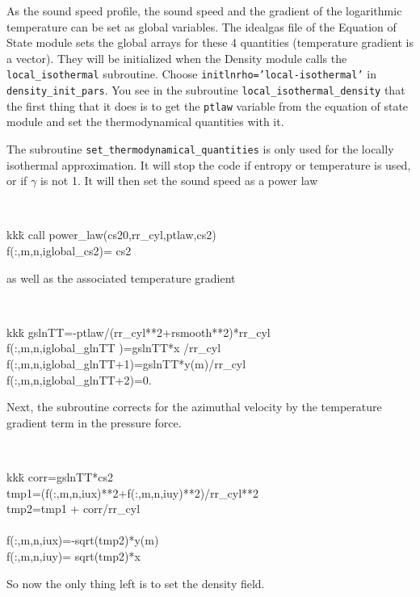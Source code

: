 \documentclass[a4paper,10pt]{article}
\begin{document}
As the sound speed profile, the sound speed and the gradient of the logarithmic temperature can be set as global variables. The idealgas file of the Equation of State module sets the global arrays for these 4 quantities (temperature gradient is a vector). They will be initialized when the Density module calls the {\tt local\_isothermal} subroutine. Choose {\tt initlnrho='local-isothermal'} in {\tt density\_init\_pars}. You see in the subroutine {\tt local\_isothermal\_density} that the first thing that it does is to get the {\tt ptlaw} variable from the equation of state module and set the thermodynamical quantities with it. 

The subroutine {\tt set\_thermodynamical\_quantities} is only used for the locally isothermal approximation. It will stop the code if entropy or temperature is used, or if $\gamma$ is not 1. It will then set the sound speed as a power law

{\tt 
\begin{tabbing}
  kkk\=\kill
  \>call power\_law(cs20,rr\_cyl,ptlaw,cs2)\\
  \>f(:,m,n,iglobal\_cs2)= cs2
\end{tabbing}
}as well as the associated temperature gradient

{\tt 
\begin{tabbing}
  kkk\=\kill
\>  gslnTT=-ptlaw/(rr\_cyl**2+rsmooth**2)*rr\_cyl\\
\>  f(:,m,n,iglobal\_glnTT  )=gslnTT*x   /rr\_cyl\\
\>  f(:,m,n,iglobal\_glnTT+1)=gslnTT*y(m)/rr\_cyl\\
\>  f(:,m,n,iglobal\_glnTT+2)=0.
\end{tabbing}
}

Next, the subroutine corrects for the azimuthal velocity by the temperature gradient term in the pressure force. 

{\tt 
\begin{tabbing}
  kkk\=\kill
        \>  corr=gslnTT*cs2\\
        \>  tmp1=(f(:,m,n,iux)**2+f(:,m,n,iuy)**2)/rr\_cyl**2\\
        \>  tmp2=tmp1 + corr/rr\_cyl\\
	  \\
	\>  f(:,m,n,iux)=-sqrt(tmp2)*y(m)\\
        \>  f(:,m,n,iuy)= sqrt(tmp2)*x
\end{tabbing}
}

So now the only thing left is to set the density field. 
\end{document}
